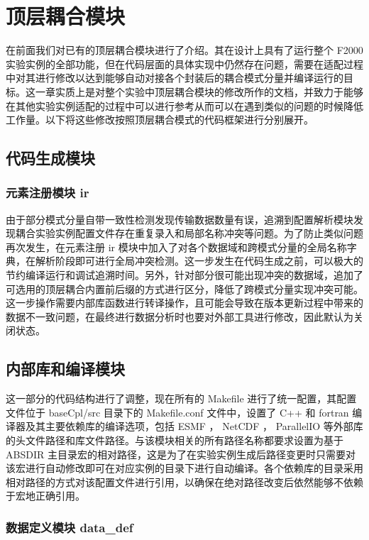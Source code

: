 \chapter{顶层耦合模块}
\label{cha:coupler}

在前面我们对已有的顶层耦合模块进行了介绍。其在设计上具有了运行整个 F2000 实验实例的全部功能，但在代码层面的具体实现中仍然存在问题，需要在适配过程中对其进行修改以达到能够自动对接各个封装后的耦合模式分量并编译运行的目标。这一章实质上是对整个实验中顶层耦合模块的修改所作的文档，并致力于能够在其他实验实例适配的过程中可以进行参考从而可以在遇到类似的问题的时候降低工作量。以下将这些修改按照顶层耦合模式的代码框架进行分别展开。

\section{代码生成模块}

\subsection{元素注册模块 ir}

由于部分模式分量自带一致性检测发现传输数据数量有误，追溯到配置解析模块发现耦合实验实例配置文件存在重复录入和局部名称冲突等问题。为了防止类似问题再次发生，在元素注册 ir 模块中加入了对各个数据域和跨模式分量的全局名称字典，在解析阶段即可进行全局冲突检测。这一步发生在代码生成之前，可以极大的节约编译运行和调试追溯时间。另外，针对部分很可能出现冲突的数据域，追加了可选用的顶层耦合内置前后缀的方式进行区分，降低了跨模式分量实现冲突可能。这一步操作需要内部库函数进行转译操作，且可能会导致在版本更新过程中带来的数据不一致问题，在最终进行数据分析时也要对外部工具进行修改，因此默认为关闭状态。

\section{内部库和编译模块}

这一部分的代码结构进行了调整，现在所有的 Makefile 进行了统一配置，其配置文件位于 baseCpl/src 目录下的 Makefile.conf 文件中，设置了 C++ 和 fortran 编译器及其主要依赖库的编译选项，包括 ESMF ， NetCDF ， ParallelIO 等外部库的头文件路径和库文件路径。与该模块相关的所有路径名称都要求设置为基于 ABSDIR 主目录宏的相对路径，这是为了在实验实例生成后路径变更时只需要对该宏进行自动修改即可在对应实例的目录下进行自动编译。各个依赖库的目录采用相对路径的方式对该配置文件进行引用，以确保在绝对路径改变后依然能够不依赖于宏地正确引用。

\subsection{数据定义模块 data\_def}


